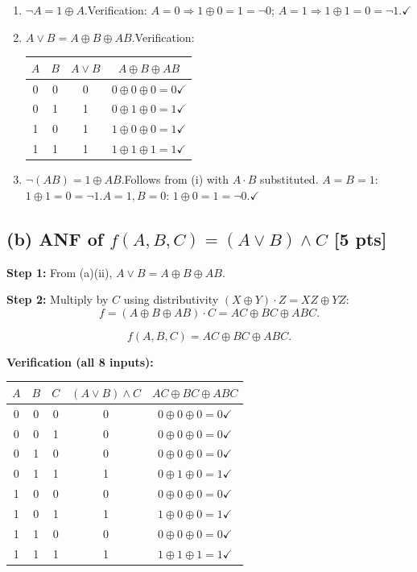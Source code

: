 \documentclass[11pt,a4paper]{article}
\begin{document}
\begin{enumerate}[label=(\roman*)]
  \item $\neg A = 1\oplus A$.\quad Verification: $A=0\Rightarrow1\oplus0=1=\neg0$;\;
    $A=1\Rightarrow1\oplus1=0=\neg1$.\;$\checkmark$

  \item $A\lor B = A\oplus B\oplus AB$.\quad Verification:
    \begin{center}
    \begin{tabular}{cc|c|c}
    $A$&$B$&$A\lor B$&$A\oplus B\oplus AB$\\\hline
    0&0&0&$0\oplus0\oplus0=0$\;$\checkmark$\\
    0&1&1&$0\oplus1\oplus0=1$\;$\checkmark$\\
    1&0&1&$1\oplus0\oplus0=1$\;$\checkmark$\\
    1&1&1&$1\oplus1\oplus1=1$\;$\checkmark$
    \end{tabular}
    \end{center}

  \item $\neg(AB) = 1\oplus AB$.\quad Follows from (i) with $A\cdot B$ substituted.
    $A=B=1$: $1\oplus1=0=\neg1$.\;$A=1,B=0$: $1\oplus0=1=\neg0$.\;$\checkmark$
\end{enumerate}

\subsection*{(b) ANF of $f(A,B,C)=(A\lor B)\land C$ [5 pts]}

\textbf{Step 1:} From (a)(ii), $A\lor B=A\oplus B\oplus AB$.

\textbf{Step 2:} Multiply by $C$ using distributivity $(X\oplus Y)\cdot Z=XZ\oplus YZ$:
\[
f=(A\oplus B\oplus AB)\cdot C=AC\oplus BC\oplus ABC.
\]

\[
\boxed{f(A,B,C)=AC\oplus BC\oplus ABC.}
\]

\textbf{Verification (all 8 inputs):}
\begin{center}
\begin{tabular}{ccc|c|c}
$A$&$B$&$C$&$(A\lor B)\land C$&$AC\oplus BC\oplus ABC$\\\hline
0&0&0&0&$0\oplus0\oplus0=0$\;$\checkmark$\\
0&0&1&0&$0\oplus0\oplus0=0$\;$\checkmark$\\
0&1&0&0&$0\oplus0\oplus0=0$\;$\checkmark$\\
0&1&1&1&$0\oplus1\oplus0=1$\;$\checkmark$\\
1&0&0&0&$0\oplus0\oplus0=0$\;$\checkmark$\\
1&0&1&1&$1\oplus0\oplus0=1$\;$\checkmark$\\
1&1&0&0&$0\oplus0\oplus0=0$\;$\checkmark$\\
1&1&1&1&$1\oplus1\oplus1=1$\;$\checkmark$
\end{tabular}
\end{center}
\end{document}
